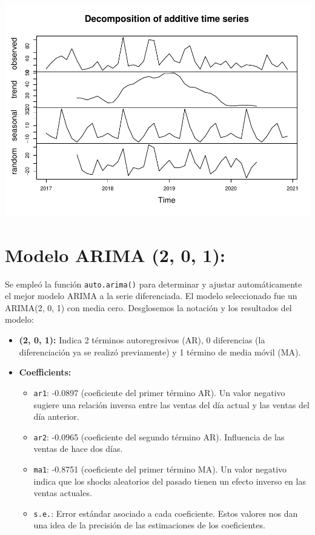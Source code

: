 \documentclass[
]{book}
\providecommand{\tightlist}{%
  \setlength{\itemsep}{0pt}\setlength{\parskip}{0pt}}
\begin{document}
\includegraphics{_main_files/figure-latex/unnamed-chunk-17-1.pdf}

\section{Modelo ARIMA (2, 0, 1):}\label{modelo-arima-2-0-1}

Se empleó la función \texttt{auto.arima()} para determinar y ajustar automáticamente el mejor modelo ARIMA a la serie diferenciada. El modelo seleccionado fue un ARIMA(2, 0, 1) con media cero. Desglosemos la notación y los resultados del modelo:

\begin{itemize}
\item
  \textbf{(2, 0, 1):} Indica 2 términos autoregresivos (AR), 0 diferencias (la diferenciación ya se realizó previamente) y 1 término de media móvil (MA).
\item
  \textbf{Coefficients:}

  \begin{itemize}
  \tightlist
  \item
    \texttt{ar1}: -0.0897 (coeficiente del primer término AR). Un valor negativo sugiere una relación inversa entre las ventas del día actual y las ventas del día anterior.
  \item
    \texttt{ar2}: -0.0965 (coeficiente del segundo término AR). Influencia de las ventas de hace dos días.
  \item
    \texttt{ma1}: -0.8751 (coeficiente del primer término MA). Un valor negativo indica que los shocks aleatorios del pasado tienen un efecto inverso en las ventas actuales.
  \item
    \texttt{s.e.}: Error estándar asociado a cada coeficiente. Estos valores nos dan una idea de la precisión de las estimaciones de los coeficientes.
  \end{itemize}
\end{itemize}
\end{document}
